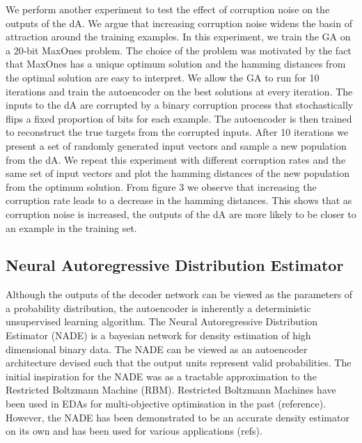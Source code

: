 \documentclass[twoside]{article}
\begin{document}
We perform another experiment to test the effect of corruption noise on the outputs of the dA. We argue that increasing corruption noise widens the basin of attraction around the training examples. In this experiment, we train the GA on a 20-bit MaxOnes problem. The choice of the problem was motivated by the fact that MaxOnes has a unique optimum solution and the hamming distances from the optimal solution are easy to interpret. We allow the GA to run for 10 iterations and train the autoencoder on the best solutions at every iteration. The inputs to the dA are corrupted by a binary corruption process that stochastically flips a fixed proportion of bits for each example. The autoencoder is then trained to reconstruct the true targets from the corrupted inputs. After 10 iterations we present a set of randomly generated input vectors and sample a new population from the dA. We repeat this experiment with different corruption rates and the same set of input vectors and  plot the hamming distances of the new population from the optimum solution. From figure 3 we observe that increasing the corruption rate leads to a decrease in the hamming distances. This shows that as corruption noise is increased, the outputs of the dA are more likely to be closer to an example in the training set.

\subsection{Neural Autoregressive Distribution Estimator}

Although the outputs of the decoder network can be viewed as the parameters of a probability distribution, the autoencoder is inherently a deterministic unsupervised learning algorithm. The Neural Autoregressive Distribution Estimator (NADE) is a bayesian network for density estimation of high dimensional binary data. The NADE can be viewed as an autoencoder architecture devised such that the output units represent valid probabilities. The initial inspiration for the NADE was as a tractable approximation to the Restricted Boltzmann Machine (RBM). Restricted Boltzmann Machines have been used in EDAs for multi-objective optimisation in the past (reference). However, the NADE has been demonstrated to be an accurate density estimator on its own and has been used for various applications (refs). 
\end{document}
